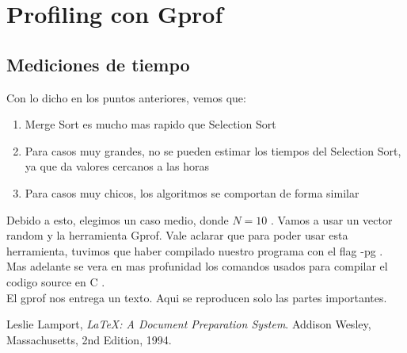 \newpage

\section{Profiling con Gprof}
\subsection{Mediciones de tiempo}
Con lo dicho en los puntos anteriores, vemos que:
\begin{enumerate} 
 \item {Merge Sort es mucho mas rapido que Selection Sort}
 \item {Para casos muy grandes, no se pueden estimar los tiempos del Selection Sort, ya que da valores cercanos a las horas}
 \item {Para casos muy chicos, los algoritmos se comportan de forma similar}
\end{enumerate}
Debido a esto, elegimos un caso medio, donde $N = 10$ . Vamos a usar un vector random y la herramienta Gprof.
Vale aclarar que para poder usar esta herramienta, tuvimos que haber compilado nuestro programa con el flag -pg .
Mas adelante se vera en mas profunidad los comandos usados para compilar el codigo source en C .
\\ El gprof nos entrega un texto. Aqui se reproducen solo las partes importantes.




\begin{thebibliography}{9}

	  Leslie Lamport,
	  \emph{\LaTeX: A Document Preparation System}.
	  Addison Wesley, Massachusetts,
	  2nd Edition,
	  1994.

\end{thebibliography}

          
